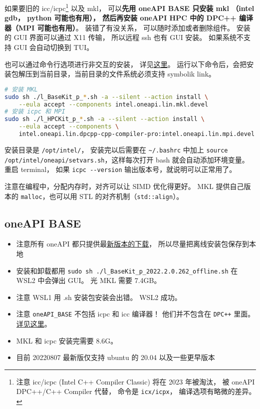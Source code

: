 

如果要旧的 icc/icpc\footnote{注意 icc/icpc (Intel C++ Compiler Classic) 将在 2023 年被淘汰， 被 oneAPI DPC++/C++ Compiler 代替， 命令是 \verb|icx/icpx|， 编译选项有略微的差异。} 以及 mkl， 可以\textbf{先用 oneAPI BASE 只安装 mkl （intel gdb， python 可能也有用）， 然后再安装 oneAPI HPC 中的 DPC++ 编译器（MPI 可能也有用）}。
装错了有没关系， 可以随时添加或者删除组件。 安装的 GUI 界面可以通过 X11 传输， 所以远程 ssh 也有 GUI 安装。 如果系统不支持 GUI 会自动切换到 TUI。

也可以通过命令行选项进行非交互的安装， 详见\href{https://www.intel.com/content/www/us/en/develop/documentation/installation-guide-for-intel-oneapi-toolkits-linux/top/installation/install-with-command-line.html#install-with-command-line}{这里}。 运行以下命令后，会把安装包解压到当前目录，当前目录的文件系统必须支持 symbolik link。
\begin{lstlisting}[language=bash]
# 安装 MKL
sudo sh ./l_BaseKit_p_*.sh -a --silent --action install \
    --eula accept --components intel.oneapi.lin.mkl.devel
# 安装 icpc 和 MPI
sudo sh ./l_HPCKit_p_*.sh -a --silent --action install \
    --eula accept --components \
    intel.oneapi.lin.dpcpp-cpp-compiler-pro:intel.oneapi.lin.mpi.devel
\end{lstlisting}

安装目录是 \verb`/opt/intel/`， 安装完以后需要在 \verb|~/.bashrc| 中加上 \verb|source /opt/intel/oneapi/setvars.sh|，这样每次打开 bash 就会自动添加环境变量。 重启 terminal， 如果 \verb`icpc --version` 输出版本号，就说明可以正常用了。

注意在编程中，分配内存时，对齐可以让 SIMD 优化得更好。 MKL 提供自己版本的 \verb|malloc|，也可以用 STL 的对齐机制（\verb|std::align|）。

\subsection{oneAPI BASE}
\begin{itemize}
\item 注意所有 oneAPI 都只提供最\href{https://www.intel.com/content/www/us/en/developer/tools/oneapi/base-toolkit-download.html?operatingsystem=linux&distributions=webdownload&options=offline}{新版本的下载}， 所以尽量把离线安装包保存到本地
\item 安装和卸载都用 \verb`sudo sh ./l_BaseKit_p_2022.2.0.262_offline.sh` 在 WSL2 中会弹出 GUI。 光 MKL 需要 7.4GB。
\item 注意 WSL1 用 .sh 安装包安装会出错。 WSL2 成功。
\item 注意 \verb|oneAPI_BASE| 不包括 icpc 和 icc 编译器！ 他们并不包含在 \verb`DPC++` 里面。 \href{https://stackoverflow.com/questions/66527842/can-not-find-the-icc-compiler-after-having-installed-intel-oneapi-invoking-from}{详见这里}。
\item MKL 和 icpc 安装完需要 8.6G。
\item 目前 20220807 最新版仅支持 ubuntu 的 20.04 以及一些更早版本
\end{itemize}

